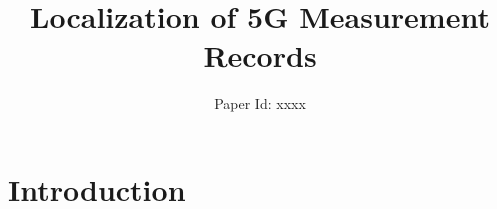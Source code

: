 \documentclass[conference, 10pt]{IEEEtran}
\title{Localization of 5G Measurement Records}
\author{Paper Id: xxxx}
\begin{document}
\maketitle


\begin{abstract}


\end{abstract}


\section{Introduction}


\end{document}
